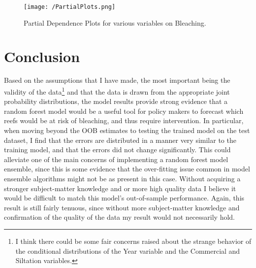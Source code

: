 \documentclass{article}
\begin{document}
\begin{figure}[!htb]
    \centering
    \texttt{[image: /PartialPlots.png]}
    \caption{Partial Dependence Plots for various variables on Bleaching.}
    \label{PP}
\end{figure}

\newpage

\section{Conclusion}
Based on the assumptions that I have made, the most important being the validity of the data\footnote{I think there could be some fair concerns raised about the strange behavior of the conditional distributions of the Year variable and the Commercial and Siltation variables.} and that the data is drawn from the appropriate joint probability distributions, the model results provide strong evidence that a random forest model would be a useful tool for policy makers to forecast which reefs would be at risk of bleaching, and thus require intervention. In particular, when moving beyond the OOB estimates to testing the trained model on the test dataset, I find that the errors are distributed in a manner very similar to the training model, and that the errors did not change significantly. This could alleviate one of the main concerns of implementing a random forest model ensemble, since this is some evidence that the over-fitting issue common in model ensemble algorithms might not be as present in this case. Without acquiring a stronger subject-matter knowledge and or more high quality data I believe it would be difficult to match this model's out-of-sample performance. Again, this result is still fairly tenuous, since without more subject-matter knowledge and confirmation of the quality of the data my result would not necessarily hold. 
\end{document}
